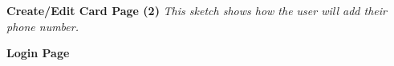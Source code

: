 \documentclass[12pt]{article}%
\begin{document}
\begin{center}
    \clearpage
    {\bf \Large Create/Edit Card Page (2)}
    {\it This sketch shows how the user will add their phone number.}

    \clearpage
    {\bf \Large Login Page}


\end{center}
\end{document}
